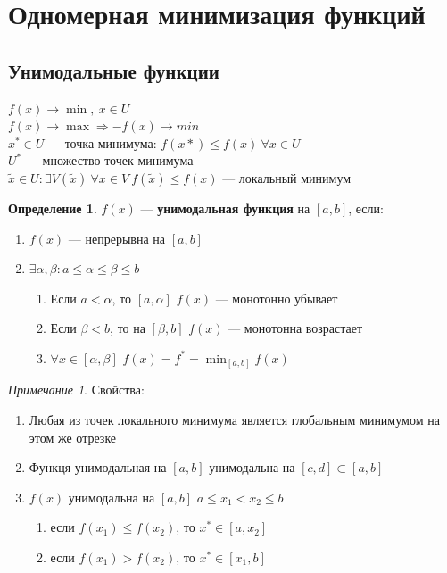 \documentclass[oneside]{book}
\theoremstyle{plain}
\theoremstyle{remark}
\newtheorem*{remark}{Примечание}
\theoremstyle{definition}
\newtheorem*{definition}{Определение}
\begin{document}
\section{Одномерная минимизация функций}
\label{sec:org7ebc51d}
\subsection{Унимодальные функции}
\label{sec:orgf25ade8}
\(f(x) \to \min,\ x \in U\) \\
\(f(x) \to \max \Rightarrow -f(x) \to min\) \\
\(x^* \in U\) --- точка минимума: \(f(x*) \le f(x)\ \forall x \in U\) \\
\(U^*\) --- множество точек минимума \\
\(\tilde{x} \in U: \exists V(\tilde{x})\ \forall x \in V\ f(\tilde{x}) \le f(x)\) --- локальный минимум
\begin{definition}
\(f(x)\) --- \textbf{унимодальная функция} на \([a, b]\), если:
\begin{enumerate}
\item \(f(x)\) --- непрерывна на \([a, b]\)
\item \(\exists \alpha, \beta: a \le \alpha\le\beta\le b\)
\begin{enumerate}
\item Если \(a < \alpha\), то \([a, \alpha]\) \(f(x)\) --- монотонно убывает
\item Если \(\beta < b\), то на \([\beta, b]\) \(f(x)\) --- монотонна возрастает
\item \(\forall x\in[\alpha, \beta]\) \(f(x) = f^* = \min_{[a, b]}f(x)\)
\end{enumerate}
\end{enumerate}
\end{definition}
\begin{remark}
Свойства:
\begin{enumerate}
\item Любая из точек локального минимума является глобальным минимумом на этом же отрезке
\item Функця унимодальная на \([a, b]\)  унимодальна на \([c, d] \subset [a, b]\)
\item \(f(x)\) унимодальна на \([a, b]\) \(a \le x_1 < x_2 \le b\)
\begin{enumerate}
\item если \(f(x_1)\le f(x_2)\), то \(x^* \in [a, x_2]\)
\item если \(f(x_1) > f(x_2)\), то \(x^* \in [x_1, b]\)
\end{enumerate}
\end{enumerate}
\end{remark}
\end{document}
